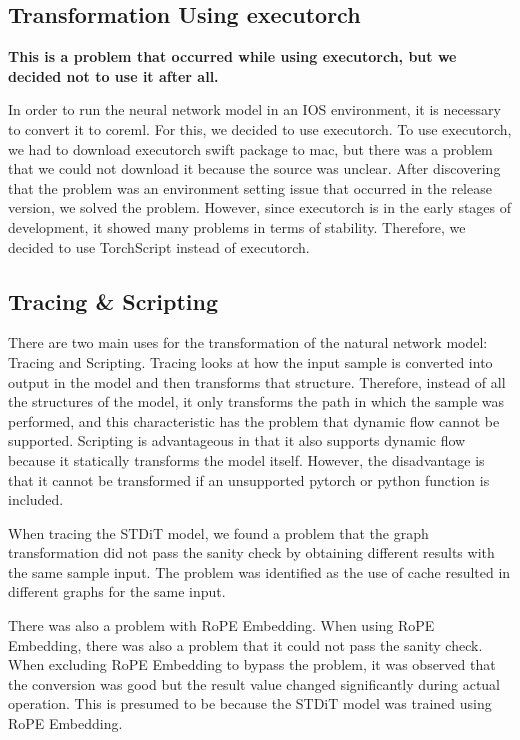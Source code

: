 \subsection{Transformation Using executorch}
\textbf{This is a problem that occurred while using executorch, but we decided not to use it after all.}

In order to run the neural network model in an IOS environment, it is necessary to convert it to coreml. For this, we decided to use executorch. To use executorch, we had to download executorch swift package to mac, but there was a problem that we could not download it because the source was unclear. After discovering that the problem was an environment setting issue that occurred in the release version, we solved the problem. However, since executorch is in the early stages of development, it showed many problems in terms of stability. Therefore, we decided to use TorchScript instead of executorch.

\subsection{Tracing \& Scripting}
There are two main uses for the transformation of the natural network model: Tracing and Scripting. Tracing looks at how the input sample is converted into output in the model and then transforms that structure. Therefore, instead of all the structures of the model, it only transforms the path in which the sample was performed, and this characteristic has the problem that dynamic flow cannot be supported. Scripting is advantageous in that it also supports dynamic flow because it statically transforms the model itself. However, the disadvantage is that it cannot be transformed if an unsupported pytorch or python function is included.

When tracing the STDiT model, we found a problem that the graph transformation did not pass the sanity check by obtaining different results with the same sample input. The problem was identified as the use of cache resulted in different graphs for the same input.

There was also a problem with RoPE Embedding. When using RoPE Embedding, there was also a problem that it could not pass the sanity check. When excluding RoPE Embedding to bypass the problem, it was observed that the conversion was good but the result value changed significantly during actual operation. This is presumed to be because the STDiT model was trained using RoPE Embedding.

